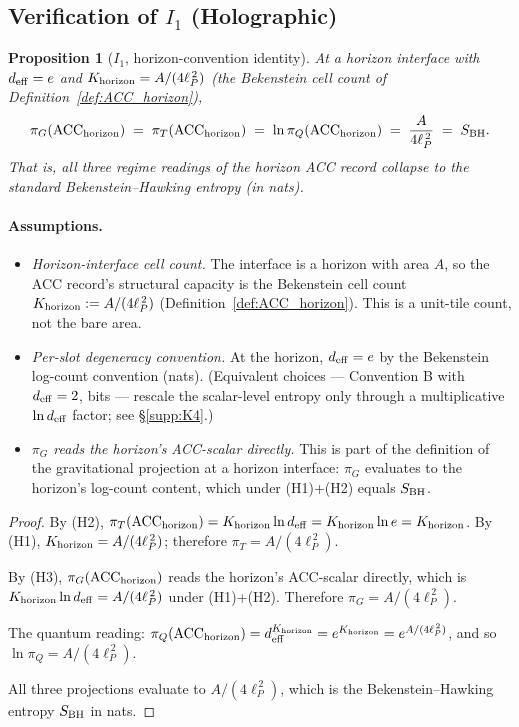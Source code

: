 \documentclass[11pt]{article}
\theoremstyle{plain}
\newtheorem{proposition}[theorem]{Proposition}
\theoremstyle{definition}
\theoremstyle{remark}
\begin{document}
\bigskip

\subsection{Verification of \texorpdfstring{$I_1$}{I1} (Holographic)}\label{supp:D1}

\begin{proposition}[$I_1$, horizon-convention identity]\label{prop:I1}
At a horizon interface with $d_{\rm eff} = e$ and $K_{\rm horizon} = A/(4\ell_P^{\,2})$ (the Bekenstein cell count of Definition~\ref{def:ACC_horizon}),
\[
  \pi_G(\mathrm{ACC}_{\rm horizon})
  \;=\; \pi_T(\mathrm{ACC}_{\rm horizon})
  \;=\; \ln \pi_Q(\mathrm{ACC}_{\rm horizon})
  \;=\; \frac{A}{4\ell_P^{\,2}}
  \;=\; S_{\rm BH}.
\]
That is, all three regime readings of the horizon ACC record collapse to the standard Bekenstein--Hawking entropy (in nats).
\end{proposition}

\paragraph{Assumptions.}
\begin{itemize}[leftmargin=2em,itemsep=2pt]
  \item[\textbf{(H1)}] \emph{Horizon-interface cell count.} The interface is a horizon with area $A$, so the ACC record's structural capacity is the Bekenstein cell count $K_{\rm horizon} := A/(4\ell_P^{\,2})$ (Definition~\ref{def:ACC_horizon}).  This is a unit-tile count, not the bare area.
  \item[\textbf{(H2)}] \emph{Per-slot degeneracy convention.} At the horizon, $d_{\rm eff} = e$ by the Bekenstein log-count convention (nats).  (Equivalent choices --- Convention B with $d_{\rm eff} = 2$, bits --- rescale the scalar-level entropy only through a multiplicative $\ln d_{\rm eff}$ factor; see \S\ref{supp:K4}.)
  \item[\textbf{(H3)}] \emph{$\pi_G$ reads the horizon's ACC-scalar directly.} This is part of the definition of the gravitational projection at a horizon interface: $\pi_G$ evaluates to the horizon's log-count content, which under (H1)+(H2) equals $S_{\rm BH}$.
\end{itemize}

\begin{proof}
By (H2), $\pi_T(\mathrm{ACC}_{\rm horizon}) = K_{\rm horizon} \ln d_{\rm eff} = K_{\rm horizon} \ln e = K_{\rm horizon}$.  By (H1), $K_{\rm horizon} = A/(4\ell_P^{\,2})$; therefore $\pi_T = A/(4\ell_P^{\,2})$.

By (H3), $\pi_G(\mathrm{ACC}_{\rm horizon})$ reads the horizon's ACC-scalar directly, which is $K_{\rm horizon} \ln d_{\rm eff} = A/(4\ell_P^{\,2})$ under (H1)+(H2).  Therefore $\pi_G = A/(4\ell_P^{\,2})$.

The quantum reading: $\pi_Q(\mathrm{ACC}_{\rm horizon}) = d_{\rm eff}^{K_{\rm horizon}} = e^{K_{\rm horizon}} = e^{A/(4\ell_P^{\,2})}$, and so $\ln \pi_Q = A/(4\ell_P^{\,2})$.

All three projections evaluate to $A/(4\ell_P^{\,2})$, which is the Bekenstein--Hawking entropy $S_{\rm BH}$ in nats.
\end{proof}
\end{document}

